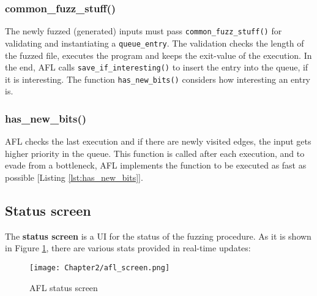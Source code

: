 

\subsubsection{common\_fuzz\_stuff()}
The newly fuzzed (generated) inputs must pass \texttt{common\_fuzz\_stuff()} for validating and instantiating a \texttt{queue\_entry}. The validation checks the length of the fuzzed file, executes the program and keeps the exit-value of the execution. In the end, AFL calls \texttt{save\_if\_interesting()} to insert the entry into the queue, if it is interesting. The function \texttt{has\_new\_bits()} considers how interesting an entry is.



\subsubsection{has\_new\_bits()}

AFL checks the last execution and if there are newly visited edges, the input gets higher priority in the queue. This function is called after each execution, and to evade from a bottleneck, AFL implements the function to be executed as fast as possible [Listing \ref{lst:has_new_bits}].



\subsection{Status screen}

The \textbf{status screen} is a UI for the status of the fuzzing procedure. As it is shown in Figure \ref{fig:status_screen}, there are various stats provided in real-time updates:
    
\begin{figure}[!b]
    \texttt{[image: Chapter2/afl\_screen.png]}
    \centering
    \caption{AFL status screen}
    \label{fig:status_screen}
\end{figure} 

